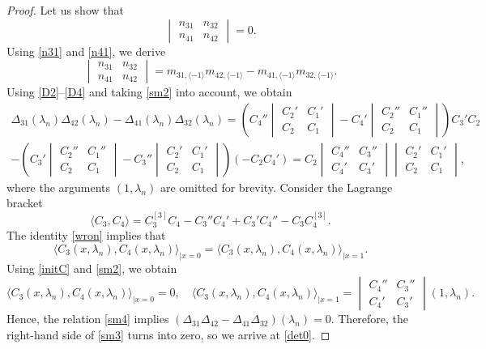 \documentclass[a4paper,12pt]{article}
\newcommand{\la}{\lambda}
\theoremstyle{plain}
\numberwithin{equation}{section}
\theoremstyle{definition}
\theoremstyle{remark}
\begin{document}
\begin{proof}
Let us show that
\begin{equation} \label{det0}
\begin{vmatrix}
n_{31} & n_{32} \\
n_{41} & n_{42}
\end{vmatrix} = 0.
\end{equation}
Using \eqref{n31} and \eqref{n41}, we derive
\begin{equation} \label{sm3}
\begin{vmatrix}
n_{31} & n_{32} \\
n_{41} & n_{42}
\end{vmatrix} = m_{31,\langle -1 \rangle} m_{42, \langle -1 \rangle} - m_{41,\langle -1 \rangle} m_{32, \langle -1 \rangle}.
\end{equation}
Using \eqref{D2}--\eqref{D4} and taking \eqref{sm2} into account, we obtain
\begin{multline} \label{sm4}
\Delta_{31}(\la_n) \Delta_{42}(\la_n) - \Delta_{41}(\la_n) \Delta_{32}(\la_n) =  
\left( C_4'' \begin{vmatrix} C_2' & C_1' \\ C_2 & C_1 \end{vmatrix} - C_4' \begin{vmatrix} C_2'' & C_1'' \\ C_2 & C_1 \end{vmatrix} \right) C_3' C_2 \\  - 
\left( C_3' \begin{vmatrix} C_2'' & C_1'' \\ C_2 & C_1 \end{vmatrix} - C_3'' \begin{vmatrix} C_2' & C_1' \\ C_2 & C_1 \end{vmatrix}\right) (-C_2 C_4') 
= C_2 \begin{vmatrix} C_4'' & C_3'' \\ C_4' & C_3' \end{vmatrix} \begin{vmatrix} C_2' & C_1' \\ C_2 & C_1 \end{vmatrix},
\end{multline}
where the arguments $(1, \la_n)$ are omitted for brevity. Consider the Lagrange bracket
$$
\langle C_3, C_4 \rangle = C_3^{[3]} C_4 - C_3'' C_4' + C_3' C_4'' - C_3 C_4^{[3]}.
$$
The identity \eqref{wron} implies that 
$$
\langle C_3(x, \la_n), C_4(x, \la_n) \rangle_{|x = 0} = \langle C_3(x, \la_n), C_4(x, \la_n) \rangle_{|x = 1}.
$$
Using \eqref{initC} and \eqref{sm2}, we obtain
$$
\langle C_3(x, \la_n), C_4(x, \la_n) \rangle_{|x = 0} = 0, \quad
\langle C_3(x, \la_n), C_4(x, \la_n) \rangle_{|x = 1} = \begin{vmatrix} C_4'' & C_3'' \\ C_4' & C_3' \end{vmatrix}(1, \la_n).
$$
Hence, the relation \eqref{sm4} implies $(\Delta_{31} \Delta_{42} - \Delta_{41}\Delta_{32})(\la_n) = 0$. Therefore, the right-hand side of \eqref{sm3} turns into zero, so we arrive at \eqref{det0}.


\end{proof}
\end{document}
